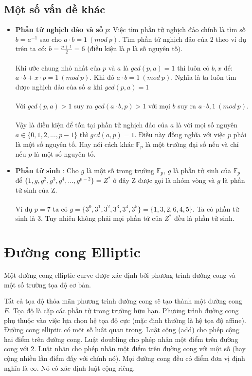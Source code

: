 \documentclass[a4paper,12pt]{report}
\begin{document}
\subsection*{Một số vấn đề khác}
\begin{itemize}
\item \textbf{Phần tử nghịch đảo  và số} $p$: Việc tìm phần tử nghịch đảo chính là tìm số $b = a^{-1}$ sao cho $a \cdot b = 1 \ (mod \ p)$. Tìm phần tử nghịch đảo của 2 theo ví dụ trên ta có: $\displaystyle b = \frac{p+1}{2} = 6$ (điều kiện là $p$ là số nguyên tố). \\ \\
Khi ước chung nhỏ nhất của $p$ và $a$ là $gcd(p, a) = 1$ thì luôn có $b, x$ để: $a \cdot b + x \cdot p = 1 \ (mod \ p)$. Khi đó $a \cdot b = 1 \ (mod \ p)$. Nghĩa là ta luôn tìm được nghịch đảo của số $a$ khi $gcd(p, a) = 1$ \\ \\
Với $gcd(p, a) > 1$ suy ra $gcd(a \cdot b, p) > 1$ với mọi $b$ suy ra $a \cdot b , 1 \ (mod \ p)$. \\ \\
Vậy là điều kiện để tồn tại phần tử nghịch đảo của $a$ là với mọi số nguyên $a \in \{0, 1, 2, \ldots , p-1 \}$ thì $gcd(a, p) = 1$. Điều này đồng nghĩa với việc $p$ phải là một số nguyên tố. Hay nói cách khác $\mathbb{F}_p$ là một trường đại số nếu và chỉ nếu $p$ là một số nguyên tố.
\item \textbf{Phần tử sinh }: Cho $g$ là một số trong trường $\mathbb{F}_p$, $g$ là phần tử sinh của $\mathbb{F}_p$ để $\{1, g, g^2, g^3, g^4, \ldots, g^{p-2}\} = Z^*$ ở đây Z được gọi là nhóm vòng  và $g$ là phần tử sinh của Z. \\ \\
Ví dụ $p = 7$ ta có $g = \{ 3^0, 3^1, 3^2, 3^3, 3^4, 3^5 \} = \{1, 3, 2, 6, 4, 5\}$. Ta có phần tử sinh là 3. Tuy nhiên không phải mọi phần tử của $Z^*$ đều là phần tử sinh.
\end{itemize}
\section{Đường cong Elliptic}
Một đường cong elliptic curve được xác định bởi phương trình đường cong và một số trường tọa độ cơ bản.

Tất cả tọa độ thỏa mãn phương trình đường cong sẽ tạo thành một đường cong $E$. Tọa độ là cặp các phần tử trong trường hữu hạn. Phương trình đường cong phụ thuộc vào việc lựa chọn hệ tọa độ cực (mặc định thường là hệ tọa độ affine). Đường cong elliptic có một số luât quan trong. Luật cộng (add) cho phép cộng hai điểm trên đường cong. Luật doubling cho phép nhân một điểm trên đường cong với 2. Luật nhân cho phép nhân một điểm trên đường cong với một số (hay cộng nhiều lần điểm đấy với chính nó). Mọi đường cong đều có điểm đơn vị định nghĩa là $\infty$. Nó có xác định luật cộng riêng.
\end{document}
